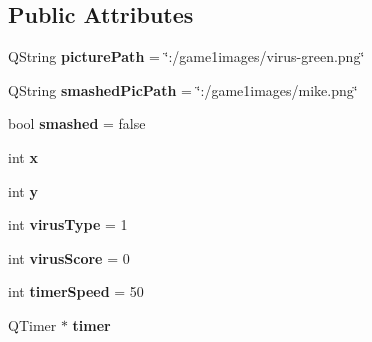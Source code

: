 \subsection*{Public Attributes}
\begin{DoxyCompactItemize}
\item 
\hypertarget{classVirusLarge_a248ecb0626b53adca976924bfe8db885}{Q\-String {\bfseries picture\-Path} = \char`\"{}\-:/game1images/virus-\/green.\-png\char`\"{}}\label{classVirusLarge_a248ecb0626b53adca976924bfe8db885}

\item 
\hypertarget{classVirusLarge_a55db6edef36b3076075a58c3da047eca}{Q\-String {\bfseries smashed\-Pic\-Path} = \char`\"{}\-:/game1images/mike.\-png\char`\"{}}\label{classVirusLarge_a55db6edef36b3076075a58c3da047eca}

\item 
\hypertarget{classVirusLarge_a289b9bee5206025dddea768e51a044de}{bool {\bfseries smashed} = false}\label{classVirusLarge_a289b9bee5206025dddea768e51a044de}

\item 
\hypertarget{classVirusLarge_ab5359e58ba24e94e01b124b0c0965047}{int {\bfseries x}}\label{classVirusLarge_ab5359e58ba24e94e01b124b0c0965047}

\item 
\hypertarget{classVirusLarge_aa84d4112904daf3e1b0eed10609b22f2}{int {\bfseries y}}\label{classVirusLarge_aa84d4112904daf3e1b0eed10609b22f2}

\item 
\hypertarget{classVirusLarge_aa0e103b493a8e1521f14bde2c32b143b}{int {\bfseries virus\-Type} = 1}\label{classVirusLarge_aa0e103b493a8e1521f14bde2c32b143b}

\item 
\hypertarget{classVirusLarge_adee2818d276e71e75edc62d4d8cbcb21}{int {\bfseries virus\-Score} = 0}\label{classVirusLarge_adee2818d276e71e75edc62d4d8cbcb21}

\item 
\hypertarget{classVirusLarge_addab58ac66d2575d66afb3c764c12886}{int {\bfseries timer\-Speed} = 50}\label{classVirusLarge_addab58ac66d2575d66afb3c764c12886}

\item 
\hypertarget{classVirusLarge_a7de3fc5029cfa419e250cd819c3eb09e}{Q\-Timer $\ast$ {\bfseries timer}}\label{classVirusLarge_a7de3fc5029cfa419e250cd819c3eb09e}

\end{DoxyCompactItemize}


